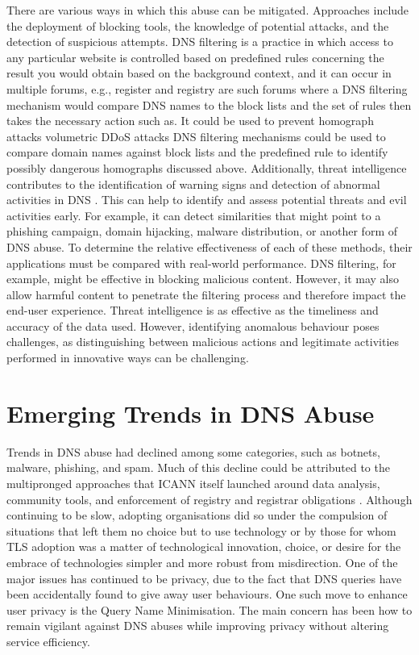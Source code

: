 There are various ways in which this abuse can be mitigated. Approaches include the deployment of blocking tools, the knowledge of potential attacks, and the detection of suspicious attempts. DNS filtering is a practice in which access to any particular website is controlled based on predefined rules concerning the result you would obtain based on the background context, and it can occur in multiple forums, e.g., register and registry are such forums where a DNS filtering mechanism would compare DNS names to the block lists and the set of rules then takes the necessary action such as. It could be used to prevent homograph attacks volumetric DDoS attacks DNS filtering mechanisms could be used to compare domain names against block lists and the predefined rule to identify possibly dangerous homographs discussed above. Additionally, threat intelligence contributes to the identification of warning signs and detection of abnormal activities in DNS \cite{rizvi2022application}. This can help to identify and assess potential threats and evil activities early. For example, it can detect similarities that might point to a phishing campaign, domain hijacking, malware distribution, or another form of DNS abuse. To determine the relative effectiveness of each of these methods, their applications must be compared with real-world performance. DNS filtering, for example, might be effective in blocking malicious content. However, it may also allow harmful content to penetrate the filtering process and therefore impact the end-user experience. Threat intelligence is as effective as the timeliness and accuracy of the data used. However, identifying anomalous behaviour poses challenges, as distinguishing between malicious actions and legitimate activities performed in innovative ways can be challenging.



\section{Emerging Trends in DNS Abuse}

Trends in DNS abuse had declined among some categories, such as botnets, malware, phishing, and spam. Much of this decline could be attributed to the multipronged approaches that ICANN itself launched around data analysis, community tools, and enforcement of registry and registrar obligations \cite{icann_dns_security_threat}. Although continuing to be slow, adopting organisations did so under the compulsion of situations that left them no choice but to use technology or by those for whom TLS adoption was a matter of technological innovation, choice, or desire for the embrace of technologies simpler and more robust from misdirection. One of the major issues has continued to be privacy, due to the fact that DNS queries have been accidentally found to give away user behaviours. One such move to enhance user privacy is the Query Name Minimisation. The main concern has been how to remain vigilant against DNS abuses while improving privacy without altering service efficiency.

